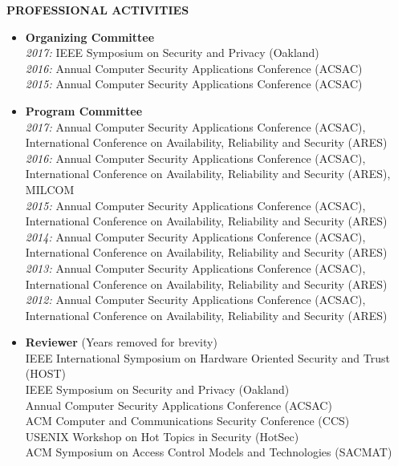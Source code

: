 \documentclass[10pt]{article}
\begin{document}
\vspace{1em} {\Large \textbf{PROFESSIONAL ACTIVITIES}}
\begin{itemize}
  \item \textbf{Organizing Committee}\\
    \textit{2017:} IEEE Symposium on Security and Privacy (Oakland)\\
    \textit{2016:} Annual Computer Security Applications Conference (ACSAC)\\
    \textit{2015:} Annual Computer Security Applications Conference (ACSAC)
  \item \textbf{Program Committee}\\
    \textit{2017:} Annual Computer Security Applications Conference (ACSAC), International Conference on Availability, Reliability and Security (ARES)\\
    \textit{2016:} Annual Computer Security Applications Conference (ACSAC), International Conference on Availability, Reliability and Security (ARES), MILCOM\\
    \textit{2015:} Annual Computer Security Applications Conference (ACSAC), International Conference on Availability, Reliability and Security (ARES)\\
    \textit{2014:} Annual Computer Security Applications Conference (ACSAC), International Conference on Availability, Reliability and Security (ARES)\\
    \textit{2013:} Annual Computer Security Applications Conference (ACSAC), International Conference on Availability, Reliability and Security (ARES)\\
    \textit{2012:} Annual Computer Security Applications Conference (ACSAC), International Conference on Availability, Reliability and Security (ARES)\\
  \item \textbf{Reviewer} (Years removed for brevity)\\
    IEEE International Symposium on Hardware Oriented Security and Trust (HOST)\\
    IEEE Symposium on Security and Privacy (Oakland)\\
    Annual Computer Security Applications Conference (ACSAC)\\
    ACM Computer and Communications Security Conference (CCS)\\
    USENIX Workshop on Hot Topics in Security (HotSec)\\
    ACM Symposium on Access Control Models and Technologies (SACMAT)\\

\end{itemize}
\end{document}
